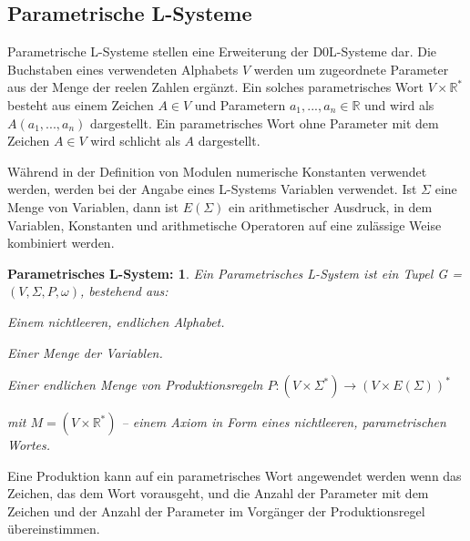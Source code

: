 \subsection{Parametrische L-Systeme}

Parametrische L-Systeme stellen eine Erweiterung der D0L-Systeme dar. Die Buchstaben eines verwendeten Alphabets $V$ werden um zugeordnete Parameter aus der Menge der reelen Zahlen ergänzt. Ein solches parametrisches Wort $V \times \mathbb{R}^*$ besteht aus einem Zeichen $A \in V$ und Parametern $a_1,...,a_n \in \mathbb{R}$ und wird als $A(a_1,...,a_n)$ dargestellt. Ein parametrisches Wort ohne Parameter mit dem Zeichen $A \in V$  wird schlicht als $A$ dargestellt. \cite[S.41]{ABOP:04}

Während in der Definition von Modulen numerische Konstanten verwendet werden, werden bei der Angabe eines L-Systems Variablen verwendet. Ist $\Sigma$ eine Menge von Variablen, dann ist $E(\Sigma)$ ein arithmetischer Ausdruck, in dem Variablen, Konstanten und arithmetische Operatoren auf eine zulässige Weise kombiniert werden. \cite[S.41]{ABOP:04}

\newtheorem{defParametrischeLSysteme}{Parametrisches L-System:}[section]
\begin{defParametrischeLSysteme}
	Ein Parametrisches L-System ist ein Tupel G = $(V, \Sigma, P, \omega)$, bestehend aus:
	\begin{description}[labelindent]
		\item[\boldmath$V$] Einem nichtleeren, endlichen Alphabet.\\
		
		\item[\boldmath$\Sigma$] Einer Menge der Variablen.\\
		
		\item[\boldmath$P$] Einer endlichen Menge von Produktionsregeln $P : (V\times \Sigma^*) \rightarrow (V\times E(\Sigma))^*$\\
		
		\item[\boldmath$\omega \in M^+$] mit $M =(V \times \mathbb{R}^*)$ -- einem Axiom in Form eines nichtleeren, parametrischen Wortes.
	\end{description}
\cite[S.41]{ABOP:04}
\end{defParametrischeLSysteme}

Eine Produktion kann auf ein parametrisches Wort angewendet werden wenn das Zeichen, das dem Wort vorausgeht, und die Anzahl der Parameter mit dem Zeichen und der Anzahl der Parameter im Vorgänger der Produktionsregel übereinstimmen. \cite[S.42]{ABOP:04}

